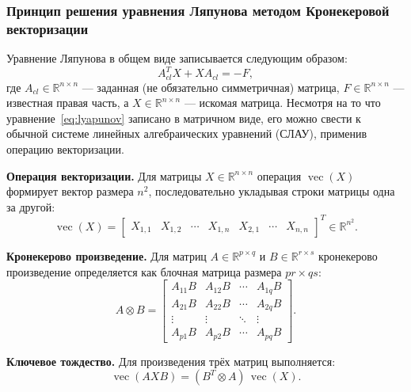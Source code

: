 \documentclass[12pt, a4paper, oneside]{extarticle}
\begin{document}
\subsubsection{Принцип решения уравнения Ляпунова методом Кронекеровой векторизации}

Уравнение Ляпунова в общем виде записывается следующим образом:
\begin{equation}
    A_{cl}^T X + X A_{cl} = -F,
    \label{eq:lyapunov}
\end{equation}
где $A_{cl} \in \mathbb{R}^{n \times n}$ --- заданная (не обязательно симметричная)
матрица, $F \in \mathbb{R}^{n \times n}$ --- известная правая часть, а
$X \in \mathbb{R}^{n \times n}$ --- искомая матрица. Несмотря на то что
уравнение~\eqref{eq:lyapunov} записано в матричном виде, его можно свести к
обычной системе линейных алгебраических уравнений (СЛАУ), применив операцию
векторизации.

\textbf{Операция векторизации.} Для матрицы $X \in \mathbb{R}^{n \times n}$
операция $\operatorname{vec}(X)$ формирует вектор размера $n^2$, последовательно
укладывая строки матрицы одна за другой:
\begin{equation*}
    \operatorname{vec}(X) =
    \begin{bmatrix}
        X_{1,1} & X_{1,2} & \cdots & X_{1,n} &
        X_{2,1} & \cdots & X_{n,n}
    \end{bmatrix}^T \in \mathbb{R}^{n^2}.
\end{equation*}

\textbf{Кронекерово произведение.} Для матриц $A \in \mathbb{R}^{p \times q}$ и
$B \in \mathbb{R}^{r \times s}$ кронекерово произведение определяется как блочная
матрица размера $pr \times qs$:
\begin{equation*}
    A \otimes B =
    \begin{bmatrix}
        A_{11} B & A_{12} B & \cdots & A_{1q} B \\
        A_{21} B & A_{22} B & \cdots & A_{2q} B \\
        \vdots   & \vdots   & \ddots & \vdots   \\
        A_{p1} B & A_{p2} B & \cdots & A_{pq} B
    \end{bmatrix}.
\end{equation*}

\textbf{Ключевое тождество.} Для произведения трёх матриц выполняется:
\begin{equation}
    \operatorname{vec}(AXB) = (B^T \otimes A)\,\operatorname{vec}(X).
    \label{eq:kron_identity}
\end{equation}
\end{document}
